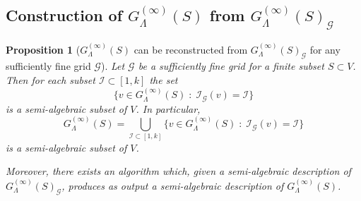 \documentclass[10pt]{amsart}
\theoremstyle{plain}
\newtheorem{proposition}[lemma]{Proposition}
\theoremstyle{definition}
\providecommand{\cG}[0]{\ensuremath{\mathcal G}\xspace}
\providecommand{\cI}[0]{\ensuremath{\mathcal I}\xspace}
\begin{document}
\subsection{Construction of $G^{(\infty)}_\Lambda(S)$ from $G^{(\infty)}_\Lambda(S)_{\cG}$}
\label{subsec:interpolation}



\begin{proposition}[$G^{(\infty)}_\Lambda(S)$ can be reconstructed from $G^{(\infty)}_\Lambda(S)_{\cG}$ for any sufficiently fine grid $\cG$]
\label{prop:struc}
 Let $\cG$ be a sufficiently fine grid for a finite subset $S \subset V$. 
Then for each subset 
$\cI \subset [1,k]$ 
the set
\[
\{v \in G^{(\infty)}_\Lambda(S) \;:\; \cI_\cG(v) = \cI \}
\]
is a semi-algebraic subset of $V$.
In particular, 
\[
G^{(\infty)}_\Lambda(S) = \bigcup_{\cI \subset [1,k]} \{v \in G^{(\infty)}_\Lambda(S) \;:\; \cI_\cG(v) = \cI \}
\]
is a semi-algebraic subset of $V$.

Moreover, there exists an algorithm which, given a semi-algebraic description of $G^{(\infty)}_\Lambda(S)_{\cG}$, produces as output a semi-algebraic description of $G^{(\infty)}_\Lambda(S)$. 
\end{proposition}
\end{document}
